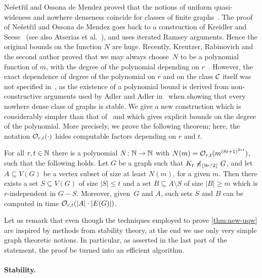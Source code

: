Ne\v{s}et\v{r}il and Ossona de Mendez proved that
the notions of uniform quasi-wideness and nowhere denseness coincide for 
classes of finite graphs~\cite{nevsetvril2011nowhere}. 
The proof of Ne\v{s}et\v{r}il 
and Ossona de Mendez goes back to a construction
of Kreidler and Seese~\cite{kreidler1998monadic} (see also Atserias et al.~\cite{atserias2006preservation}), 
and uses iterated Ramsey arguments. Hence the original bounds on 
the function $N$ are huge. Recently, Kreutzer, Rabinovich and the second author
 proved that we may always choose~$N$ to be a polynomial 
function of $m$, with the degree of the polynomial depending on $r$~\cite{siebertz2016polynomial}. However, the exact dependence of degree of the polynomial on $r$ and on the class $\mathcal{C}$ itself
 was  not specified in~\cite{siebertz2016polynomial}, as the existence of a polynomial bound is derived
from non-constructive arguments used by Adler and Adler in~\cite{adler2014interpreting} when showing that every nowhere dense class of graphs
is stable. We give a new construction 
which is considerably simpler than that of~\cite{siebertz2016polynomial}
and which gives explicit bounds on the degree of the polynomial. 
More precisely, we prove the following theorem; here, the notation $\mathcal{O}_{r,t}(\cdot)$ hides computable factors depending on $r$ and $t$.

\begin{theorem}\label{thm:new-uqw}
For all $r,t\in \mathbb{N}$ there is a polynomial  $N\colon \mathbb{N}\to \mathbb{N}$ with $N(m)=
\mathcal{O}_{r,t}{(m^{{(8t+1)}^{2rt}})}$, such that the following holds.
Let $G$ be a graph such that $K_t\not\preccurlyeq_{\lfloor 9r/2\rfloor} G$, and
let $A\subseteq V(G)$ be a vertex subset of size at least $N(m)$, for a given $m$.
Then there exists a set $S\subseteq V(G)$ of size $|S|\leq t$ and a set $B\subseteq A\setminus S$ 
of size $|B|\geq m$ which is $r$-independent in $G-S$.
Moreover, given~$G$ and $A$, such sets $S$ and $B$ can be computed in time $\mathcal{O}_{r,t}(|A|\cdot |E(G)|)$. 
\end{theorem}

Let us remark
that even though the techniques employed to prove \cref{thm:new-uqw} are inspired by methods from stability theory, 
at the end we use only very simple graph theoretic notions. In particular, as asserted in the last part of the statement, the
proof  be turned into an efficient algorithm.

\paragraph{Stability.}


